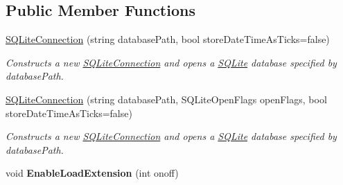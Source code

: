 \subsection*{Public Member Functions}
\begin{DoxyCompactItemize}
\item 
\hyperlink{classSQLite_1_1SQLiteConnection_a21204da14d0e2a44039f3395bb4ff12d}{S\+Q\+Lite\+Connection} (string database\+Path, bool store\+Date\+Time\+As\+Ticks=false)
\begin{DoxyCompactList}\small\item\em Constructs a new \hyperlink{classSQLite_1_1SQLiteConnection}{S\+Q\+Lite\+Connection} and opens a \hyperlink{namespaceSQLite}{S\+Q\+Lite} database specified by database\+Path. \end{DoxyCompactList}\item 
\hyperlink{classSQLite_1_1SQLiteConnection_a5d0deb6299d3f479e53cf81899023457}{S\+Q\+Lite\+Connection} (string database\+Path, S\+Q\+Lite\+Open\+Flags open\+Flags, bool store\+Date\+Time\+As\+Ticks=false)
\begin{DoxyCompactList}\small\item\em Constructs a new \hyperlink{classSQLite_1_1SQLiteConnection}{S\+Q\+Lite\+Connection} and opens a \hyperlink{namespaceSQLite}{S\+Q\+Lite} database specified by database\+Path. \end{DoxyCompactList}\item 
\hypertarget{classSQLite_1_1SQLiteConnection_ae9cb05b6c85322d73dd70688182edb01}{}void {\bfseries Enable\+Load\+Extension} (int onoff)\label{classSQLite_1_1SQLiteConnection_ae9cb05b6c85322d73dd70688182edb01}


\end{DoxyCompactItemize}
